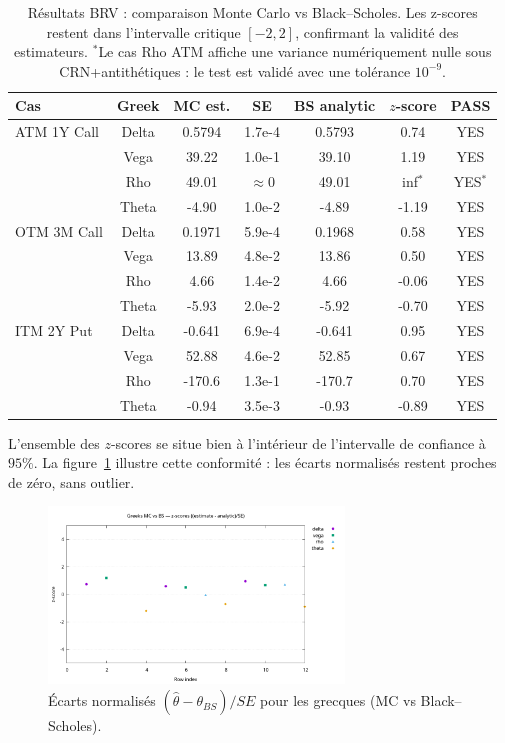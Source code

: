 \documentclass[a4paper,11pt]{article}
\begin{document}
\begin{table}[H]
\centering
\begin{tabular}{lcccccc}
\toprule
Cas & Greek & MC est. & SE & BS analytic & $z$-score & PASS \\
\midrule
ATM 1Y Call & Delta & 0.5794 & 1.7e-4 & 0.5793 & 0.74 & YES \\
            & Vega  & 39.22  & 1.0e-1 & 39.10  & 1.19 & YES \\
            & Rho   & 49.01  & $\approx 0$ & 49.01  & inf$^\ast$ & YES$^\ast$ \\
            & Theta & -4.90  & 1.0e-2 & -4.89  & -1.19 & YES \\
\midrule
OTM 3M Call & Delta & 0.1971 & 5.9e-4 & 0.1968 & 0.58 & YES \\
            & Vega  & 13.89  & 4.8e-2 & 13.86  & 0.50 & YES \\
            & Rho   & 4.66   & 1.4e-2 & 4.66   & -0.06 & YES \\
            & Theta & -5.93  & 2.0e-2 & -5.92  & -0.70 & YES \\
\midrule
ITM 2Y Put  & Delta & -0.641 & 6.9e-4 & -0.641 & 0.95 & YES \\
            & Vega  & 52.88  & 4.6e-2 & 52.85  & 0.67 & YES \\
            & Rho   & -170.6 & 1.3e-1 & -170.7 & 0.70 & YES \\
            & Theta & -0.94  & 3.5e-3 & -0.93  & -0.89 & YES \\
\bottomrule
\end{tabular}
\caption{Résultats BRV : comparaison Monte Carlo vs Black–Scholes. 
Les z-scores restent dans l’intervalle critique $[-2,2]$, confirmant la validité des estimateurs.
$^\ast$Le cas Rho ATM affiche une variance numériquement nulle sous CRN+antithétiques : 
le test est validé avec une tolérance $10^{-9}$.}
\label{tab:greeks_brv}
\end{table}

L’ensemble des $z$-scores se situe bien à l’intérieur de l’intervalle de confiance à $95\%$.  
La figure~\ref{fig:greeks_z} illustre cette conformité : les écarts normalisés restent proches de zéro, sans outlier.  

\begin{figure}[H]
\centering
\includegraphics[width=0.7\textwidth]{img/greeks_zscores.png}
\caption{Écarts normalisés $(\hat\theta - \theta_{BS})/SE$ pour les grecques (MC vs Black–Scholes).}
\label{fig:greeks_z}
\end{figure}
\end{document}

